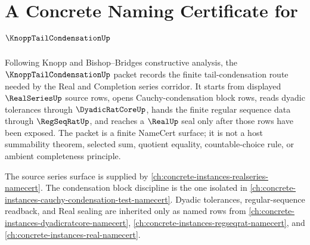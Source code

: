 \chapter{A Concrete Naming Certificate for $\KnoppTailCondensationUp$}
\label{ch:concrete-instances-knopp-tail-condensation-namecert}

Following Knopp and Bishop--Bridges constructive analysis, the $\KnoppTailCondensationUp$ packet records the finite tail-condensation route needed by the Real and Completion series corridor. It starts from displayed $\RealSeriesUp$ source rows, opens Cauchy-condensation block rows, reads dyadic tolerances through $\DyadicRatCoreUp$, hands the finite regular sequence data through $\RegSeqRatUp$, and reaches a $\RealUp$ seal only after those rows have been exposed. The packet is a finite NameCert surface; it is not a host summability theorem, selected sum, quotient equality, countable-choice rule, or ambient completeness principle.

The source series surface is supplied by \autoref{ch:concrete-instances-realseries-namecert}. The condensation block discipline is the one isolated in \autoref{ch:concrete-instances-cauchy-condensation-test-namecert}. Dyadic tolerances, regular-sequence readback, and Real sealing are inherited only as named rows from \autoref{ch:concrete-instances-dyadicratcore-namecert}, \autoref{ch:concrete-instances-regseqrat-namecert}, and \autoref{ch:concrete-instances-real-namecert}.

